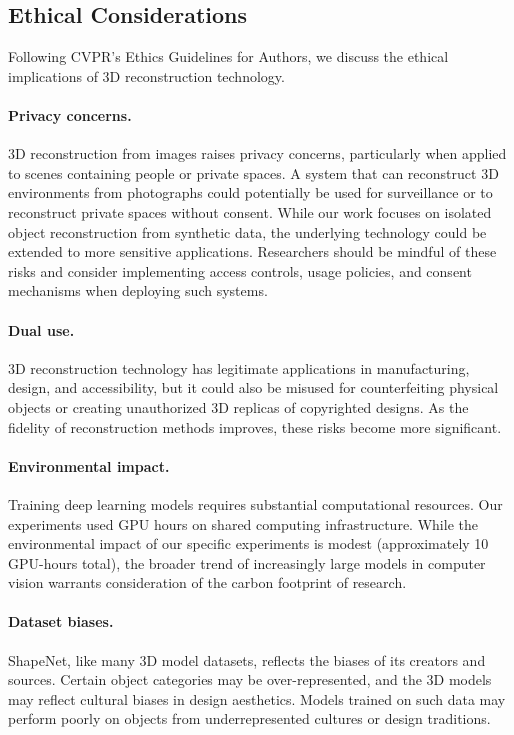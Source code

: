 \documentclass[10pt,twocolumn,letterpaper]{article}
\begin{document}
\subsection{Ethical Considerations}

Following CVPR's Ethics Guidelines for Authors, we discuss the ethical implications of 3D reconstruction technology.

\paragraph{Privacy concerns.} 3D reconstruction from images raises privacy concerns, particularly when applied to scenes containing people or private spaces. A system that can reconstruct 3D environments from photographs could potentially be used for surveillance or to reconstruct private spaces without consent. While our work focuses on isolated object reconstruction from synthetic data, the underlying technology could be extended to more sensitive applications. Researchers should be mindful of these risks and consider implementing access controls, usage policies, and consent mechanisms when deploying such systems.

\paragraph{Dual use.} 3D reconstruction technology has legitimate applications in manufacturing, design, and accessibility, but it could also be misused for counterfeiting physical objects or creating unauthorized 3D replicas of copyrighted designs. As the fidelity of reconstruction methods improves, these risks become more significant.

\paragraph{Environmental impact.} Training deep learning models requires substantial computational resources. Our experiments used GPU hours on shared computing infrastructure. While the environmental impact of our specific experiments is modest (approximately 10 GPU-hours total), the broader trend of increasingly large models in computer vision warrants consideration of the carbon footprint of research.

\paragraph{Dataset biases.} ShapeNet, like many 3D model datasets, reflects the biases of its creators and sources. Certain object categories may be over-represented, and the 3D models may reflect cultural biases in design aesthetics. Models trained on such data may perform poorly on objects from underrepresented cultures or design traditions.
\end{document}
